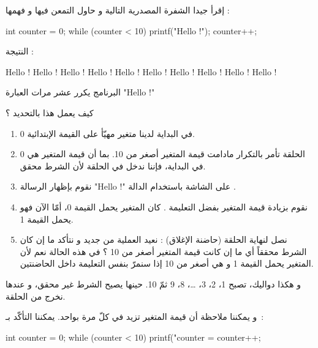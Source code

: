 إقرأ جيدا الشفرة المصدرية التالية و حاول التمعن فيها و فهمها :

\begin{Csource}
int counter = 0;
while (counter < 10)
{
	printf("Hello !\n");
	counter++;
}
\end{Csource}

النتيجة :

\begin{Console}
Hello !
Hello !
Hello !
Hello !
Hello !
Hello !
Hello !
Hello !
Hello !
Hello !
\end{Console}

البرنامج يكرر عشر مرات العبارة
"\textenglish{Hello !}"

\begin{question}
كيف يعمل هذا بالتحديد ؟
\end{question}

\begin{enumerate}
	\item في البداية لدينا متغير 
	مهيّأ على القيمة الإبتدائية 0.
	\item الحلقة 
تأمر بالتكرار مادامت قيمة المتغير
أصغر من 10. بما أن قيمة المتغير 
هي 0 في البداية، فإننا ندخل في الحلقة لأن الشرط محقق.
	\item نقوم بإظهار الرسالة 
	"\textenglish{Hello !}"
على الشاشة باستخدام الدالة 
.
	\item نقوم بزيادة قيمة المتغير 
بفضل التعليمة 
	.
كان المتغير
يحمل القيمة 0، أمّا الآن فهو يحمل القيمة 1.
	\item نصل لنهاية الحلقة (حاضنة الإغلاق) : نعيد العملية من جديد و نتأكد ما إن كان الشرط محققاً أي ما إن كانت قيمة المتغير أصغر من 10 ؟ في هذه الحالة نعم لأن المتغير
	يحمل القيمة 1 و هي أصغر من 10 إذا سنمرّ بنفس التعليمة داخل الحاضنتين.
\end{enumerate}

و هكذا دواليك،
تصبح 1، 2، 3، \dots، 8، 9 ثمّ 10. حينها يصيح الشرط 
غير محقق، و عندها نخرج من الحلقة.

و يمكننا ملاحظة أن قيمة المتغير
 تزيد في كلّ مرة بواحد. يمكننا التأكّد بـ~:

\begin{Csource}
int counter = 0;
while (counter < 10)
{
	printf("counter = %
	counter++;
}
\end{Csource}

